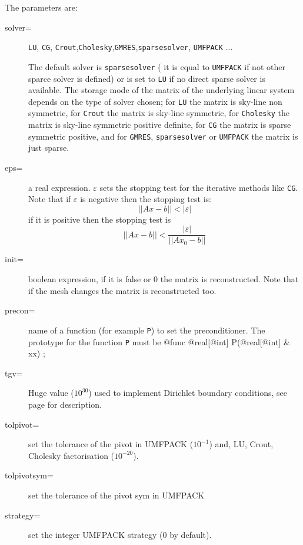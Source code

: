 \documentclass[a4paper,twoside,12pt]{book}
\begin{document}
The parameters are:
\begin{description}
    \item[solver=]   \texttt{LU}, \texttt{CG},
    \texttt{Crout},\texttt{Cholesky},\texttt{GMRES},\texttt{sparsesolver}, \texttt{UMFPACK} ...


    The default solver is \texttt{sparsesolver} ( it is equal to  \texttt{UMFPACK}  if not other sparce solver is defined) or is set to
    \texttt{LU} if no direct sparse solver is available.
    The storage mode of the matrix of the underlying linear system
    depends on
    the type of solver chosen; for \texttt{LU}  the matrix is sky-line non
    symmetric, for \texttt{Crout} the matrix is sky-line symmetric, for
    \texttt{Cholesky} the matrix is sky-line symmetric positive
    definite,  for \texttt{CG}   the matrix is sparse symmetric positive,
    and for \texttt{GMRES}, \texttt{sparsesolver} or \texttt{UMFPACK} the matrix is just  sparse.

    \item[eps=]     a real expression. $\varepsilon$  sets the stopping test for
    the iterative methods like \texttt{CG}. Note that if $\varepsilon$
    is negative  then the stopping test is:
    $$  || A x - b || < |\varepsilon| $$
    if it is positive then the stopping test is 
        $$  || A x - b || < \frac{|\varepsilon|}{|| A x_{0} - b ||} $$

    \item[init=]     boolean expression, if it is false or 0 
    the matrix is reconstructed. Note that if the mesh changes the matrix is
    reconstructed too.
    \item[precon=]    name of a function (for example \texttt{P}) to set the preconditioner. 
    The prototype for the function \texttt{P} must be
\bFF
    @func @real[@int]  P(@real[@int] & xx) ;
\eFF
      \item[tgv=]      Huge value ($10^{30}$) used to implement
      Dirichlet boundary conditions,   see page \pageref{imple-tgv} for description.

      \item[tolpivot=]   set the tolerance of the pivot in UMFPACK ($10^{-1}$)  and, LU, Crout, Cholesky
      factorisation ($10^{-20}$).

      \item[tolpivotsym=]   set the tolerance of the pivot sym in UMFPACK
      \item[strategy=]   set the integer UMFPACK strategy  ($0$ by default).

\end{description}
\end{document}

